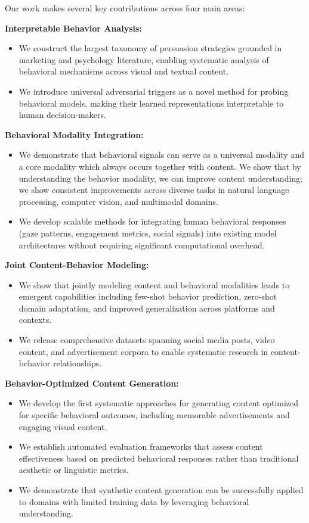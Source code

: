 Our work makes several key contributions across four main areas:

\textbf{Interpretable Behavior Analysis:}
\begin{itemize}
    \item We construct the largest taxonomy of persuasion strategies grounded in marketing and psychology literature, enabling systematic analysis of behavioral mechanisms across visual and textual content.
    \item We introduce universal adversarial triggers as a novel method for probing behavioral models, making their learned representations interpretable to human decision-makers.
\end{itemize}

\textbf{Behavioral Modality Integration:}
\begin{itemize}
    \item We demonstrate that behavioral signals can serve as a universal modality and a core modality which always occurs together with content. We show that by understanding the behavior modality, we can improve content understanding; we show consistent improvements across diverse tasks in natural language processing, computer vision, and multimodal domains.
    \item We develop scalable methods for integrating human behavioral responses (gaze patterns, engagement metrics, social signals) into existing model architectures without requiring significant computational overhead.
\end{itemize}

\textbf{Joint Content-Behavior Modeling:}
\begin{itemize}
    \item We show that jointly modeling content and behavioral modalities leads to emergent capabilities including few-shot behavior prediction, zero-shot domain adaptation, and improved generalization across platforms and contexts.
    \item We release comprehensive datasets spanning social media posts, video content, and advertisement corpora to enable systematic research in content-behavior relationships.
\end{itemize}

\textbf{Behavior-Optimized Content Generation:}
\begin{itemize}
    \item We develop the first systematic approaches for generating content optimized for specific behavioral outcomes, including memorable advertisements and engaging visual content.
    \item We establish automated evaluation frameworks that assess content effectiveness based on predicted behavioral responses rather than traditional aesthetic or linguistic metrics.
    \item We demonstrate that synthetic content generation can be successfully applied to domains with limited training data by leveraging behavioral understanding.
\end{itemize}

